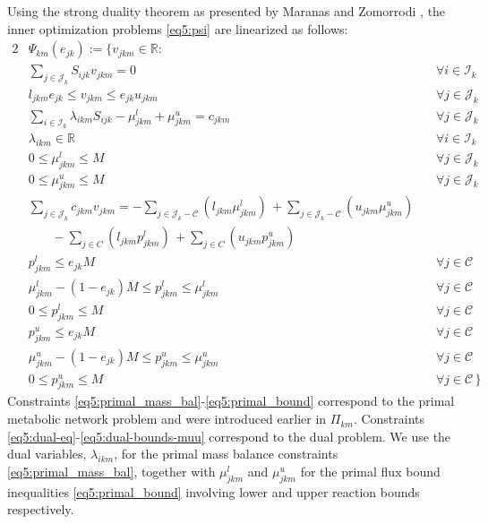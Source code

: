 Using the strong duality theorem as presented by Maranas and Zomorrodi \citep{maranas2016}, the inner optimization problems \eqref{eq5:psi} are linearized as follows:
\begin{alignat}{2}
&	\Psi_{km}(e_{jk}) := \{v_{jkm} \in \mathbb{R}:  \\
%
&	\sum_{j\in \mathcal{J}_k} S_{ijk} v_{jkm} =0  && \forall i\in \mathcal{I}_k 		\label{eq5:primal_mass_bal}\\
		& l_{jkm} e_{jk}  \le v_{jkm} \le e_{jk} u_{jkm} \;  && \forall j\in \mathcal{J}_k 			\label{eq5:primal_bound}\\
&\sum_{i\in \mathcal{I}_k} \lambda_{ikm} S_{ijk}-\mu_{jkm}^{l} +\mu_{jkm}^{u}  = c_{jkm} && \forall j\in \mathcal{J}_k	\label{eq5:dual-eq}\\
%
& \lambda_{ikm} \in \mathbb{R} && \forall i \in \mathcal{I}_k \label{eq5:dual-bounds-lambda}\\
&0\le \mu_{jkm}^{l} \le M && \forall j\in \mathcal{J}_k								\label{eq5:dual-bounds-mul}	\\
&0\le \mu_{jkm}^{u} \le M && \forall j\in \mathcal{J}_k								\label{eq5:dual-bounds-muu} \\
%
\nonumber &\sum_{j\in \mathcal{J}_k} c_{jkm} v_{jkm}=
-\sum_{j\in \mathcal{J}_k - \mathcal{C}}(l_{jkm}\mu_{jkm}^{l})\, +
\sum_{j\in \mathcal{J}_k - \mathcal{C}}(u_{jkm}\mu_{jkm}^{u}) \,
\label{eq5:sd}	\\ &\phantom{{}=1}
-\sum_{j\in C}(l_{jkm}p_{jkm}^{l}) \,+
\sum_{j\in C}(u_{jkm} p_{jkm}^{u})\\
%
& p_{jkm}^{l}\le e_{jk} M && \forall j\in \mathcal{C}				\label{eq5:lin1}	\\
&\mu_{jkm}^{l}-(1-e_{jk})M \le p_{jkm}^{l} \le \mu_{jkm}^{l} && \forall j\in \mathcal{C} \label{eq5:lin2} \\
&0\le p_{jkm}^{l}\le M && \forall j\in \mathcal{C} \label{eq5:lin3}\\
%
& p_{jkm}^{u}\le e_{jk} M  && \forall j\in \mathcal{C} \label{eq5:lin4}\\
&\mu_{jkm}^{u}-(1-e_{jk}) M \le p_{jkm}^{u}\le \mu_{jkm}^{u} && \forall j\in  \mathcal{C} \label{eq5:lin5} \\
&0\le p_{jkm}^{u}\le M && \forall j\in \mathcal{C} \label{eq5:lin6}  \, \}
\end{alignat}
\noindent Constraints \eqref{eq5:primal_mass_bal}-\eqref{eq5:primal_bound} correspond to the primal metabolic network problem and were introduced earlier in $\Pi_{km}$.
Constraints \eqref{eq5:dual-eq}-\eqref{eq5:dual-bounds-muu} correspond to the dual problem. We use the dual variables, $\lambda_{ikm}$, for the primal mass balance constraints \eqref{eq5:primal_mass_bal}, together with $\mu^{l}_{jkm}$ and $\mu^{u}_{jkm}$ for the primal flux bound inequalities \eqref{eq5:primal_bound} involving lower and upper reaction bounds respectively.
